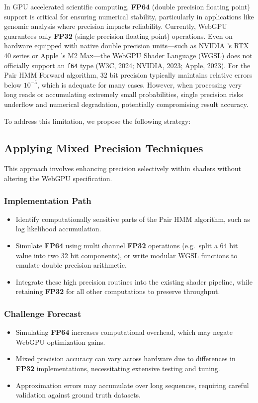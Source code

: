 \documentclass[PhD]{PHlab-thesis}
\begin{document}
In GPU accelerated scientific computing, \textbf{FP64} (double precision floating point) support is critical for ensuring numerical stability, particularly in applications like genomic analysis where precision impacts reliability. Currently, WebGPU guarantees only \textbf{FP32} (single precision floating point) operations. Even on hardware equipped with native double precision units—such as NVIDIA 's RTX 40 series or Apple 's M2 Max—the WebGPU Shader Language (WGSL) does not officially support an \texttt{f64} type (W3C, 2024; NVIDIA, 2023; Apple, 2023). For the Pair HMM Forward algorithm, 32 bit precision typically maintains relative errors below $10^{-5}$, which is adequate for many cases. However, when processing very long reads or accumulating extremely small probabilities, single precision risks underflow and numerical degradation, potentially compromising result accuracy.

To address this limitation, we propose the following strategy:

\subsection*{Applying Mixed Precision Techniques}

This approach involves enhancing precision selectively within shaders without altering the WebGPU specification.

\subsubsection*{Implementation Path}
\begin{itemize}
  \item Identify computationally sensitive parts of the Pair HMM algorithm, such as log likelihood accumulation.
  \item Simulate \textbf{FP64} using multi channel \textbf{FP32} operations (e.g.\ split a 64 bit value into two 32 bit components), or write modular WGSL functions to emulate double precision arithmetic.
  \item Integrate these high precision routines into the existing shader pipeline, while retaining \textbf{FP32} for all other computations to preserve throughput.
\end{itemize}

\subsubsection*{Challenge Forecast}
\begin{itemize}
  \item Simulating \textbf{FP64} increases computational overhead, which may negate WebGPU optimization gains.
  \item Mixed precision accuracy can vary across hardware due to differences in \textbf{FP32} implementations, necessitating extensive testing and tuning.
  \item Approximation errors may accumulate over long sequences, requiring careful validation against ground truth datasets.
\end{itemize}
\end{document}
